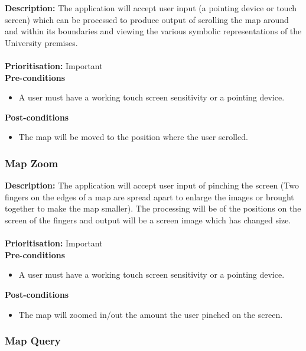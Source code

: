 \documentclass[runningheads,a4paper]{article}
\begin{document}
\textbf{Description:}  The application will accept user input (a pointing device or touch screen) which can be processed to produce output of scrolling the map around and within its boundaries and viewing the various symbolic representations of the University premises.\\\\
\noindent
\textbf{Prioritisation:} Important\\
  
  
\textbf{Pre-conditions}
\begin{itemize}
 	\item A user must have a working touch screen sensitivity or a pointing device.
\end{itemize}
  
\textbf{Post-conditions}
\begin{itemize}
	\item The map will be moved to the position where the user scrolled. 
\end{itemize}

\subsubsection{Map Zoom}

\textbf{Description:}  The application will accept user input of pinching the screen (Two fingers on the edges of a map are spread apart to enlarge the images or brought together to make the map smaller). The processing will be of the positions on the screen of the fingers and output will be a screen image which has changed size.\\\\
\noindent
\textbf{Prioritisation:} Important\\
  
  
\textbf{Pre-conditions}
\begin{itemize}
 	\item A user must have a working touch screen sensitivity or a pointing device.
\end{itemize}
  
\textbf{Post-conditions}
\begin{itemize}
	\item The map will zoomed in/out the amount the user pinched on the screen. 
\end{itemize}

\subsubsection{Map Query}
\end{document}
